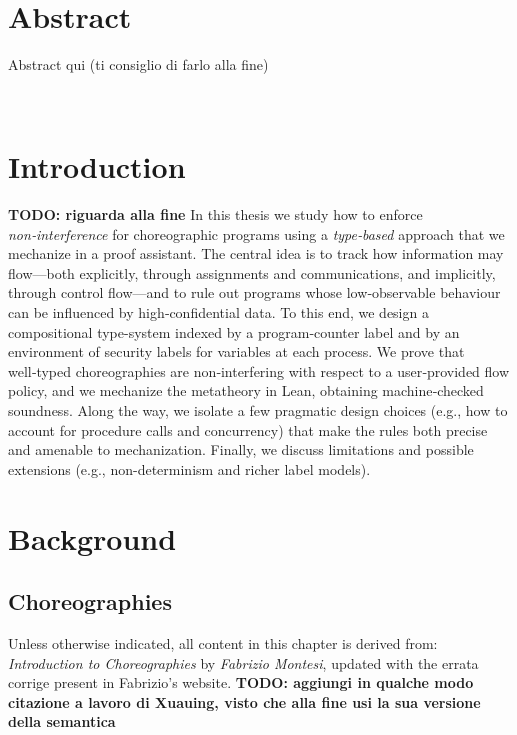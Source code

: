 \documentclass[12pt,a4paper,twoside]{book}
\begin{document}
\newpage~\newpage

\chapter*{Abstract}
Abstract qui (ti consiglio di farlo alla fine)
\topmargin=-1cm

\tableofcontents
\thispagestyle{empty}

\newpage~\newpage


\raggedbottom
\chapter{Introduction} \label{chap:intro}
\pagestyle{plain}
\setcounter{page}{1}
\textbf{TODO: riguarda alla fine}
In this thesis we study how to enforce \emph{non‑interference} for choreographic programs using a \emph{type‑based} approach that we mechanize in a proof assistant.
The central idea is to track how information may flow—both explicitly, through assignments and communications, and implicitly, through control flow—and to rule out programs whose low‑observable behaviour can be influenced by high‑confidential data.
To this end, we design a compositional type-system indexed by a program‑counter label and by an environment of security labels for variables at each process.
We prove that well‑typed choreographies are non‑interfering with respect to a user‑provided flow policy, and we mechanize the metatheory in Lean, obtaining machine‑checked soundness.
Along the way, we isolate a few pragmatic design choices (e.g., how to account for procedure calls and concurrency) that make the rules both precise and amenable to mechanization.
Finally, we discuss limitations and possible extensions (e.g., non-determinism and richer label models).

\chapter{Background} \label{chap:background}
\section{Choreographies}
\label{background:choreographies}
Unless otherwise indicated, all content in this chapter is derived from: \textit{Introduction to Choreographies\cite{montesi2023introduction}} by \textit{Fabrizio Montesi}, updated with the errata corrige present in Fabrizio's website\cite{montesiChoreographies}.
\textbf{TODO: aggiungi in qualche modo citazione a lavoro di Xuauing, visto che alla fine usi la sua versione della semantica}
\vspace{10pt}
\end{document}
